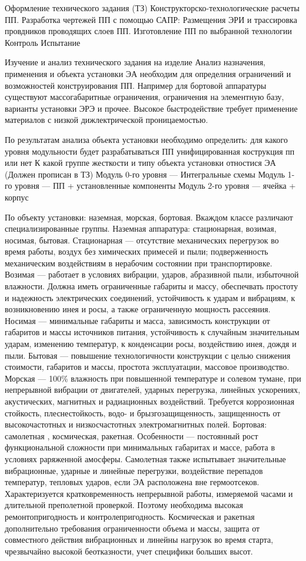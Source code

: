 \documentclass{article}
\begin{document}
Оформление технического задания (ТЗ)
Конструкторско-технологические расчеты ПП.
Разработка чертежей ПП с помощью САПР: Размещения ЭРИ и трассировка провдников проводящих слоев ПП.
Изготовление ПП по выбранной технологии
Контроль
Испытание

Изучение и анализ технического задания на изделие
Анализ назначения, применения и объекта установки ЭА необходим для определния ограничений и возможностей конструирования ПП. Например для бортовой аппаратуры существуют массогабаритные ограничения, ограничения на элементную базу, варианты установки ЭРЭ и прочее. Высокое быстродействие требует применение материалов с низкой дижлектрической проницаемостью.

По результатам анализа объекта установки необходимо определить:
для какого уровня модульности будет разрабатываться ПП
унифицированная кострукция пп или нет
К какой группе жесткости и типу объекта установки отностися ЭА (Должен прописан в ТЗ)
Модуль 0-го уровня --- Интегральные схемы
Модуль 1-го уровня --- ПП + установленные компоненты
Модуль 2-го уровня --- ячейка + корпус

По объекту установки: наземная, морская, бортовая. Вкаждом классе различают специализированные группы.
Наземная аппаратура: стационарная, возимая, носимая, бытовая.
Стационарная --- отсутствие механических перегрузок во время работы, воздух без химических примесей и пыли; подверженность механическим воздействиям в нерабочим состоянии при транспортировке.
Возимая --- работает в условиях вибрации, ударов, абразивной пыли, избыточной влажности. Должна иметь ограниченные габариты и массу, обеспечвать простоту и надежность электрических соединений, устойчивость к ударам и вибрациям, к возникновению инея и росы, а также ограниченную мощность рассеяния.
Носимая --- минимальные габариты и масса, зависимость конструкции от габаритов и массы источников питания, устойчивость к случайным значительным ударам, изменению температур, к конденсации росы, воздействию инея, дождя и пыли.
Бытовая --- повышение технологичности конструкции с целью снижения стоимости, габаритов и массы, простота эксплуатации, массовое производство.
Морская --- 100\% влажность при повышенной температуре и солевом тумане, при непрерывной вибрации от двигателей, ударных перегрузка, линейных ускорениях, акустических, магнитных и радиационных воздействий. Требуется коррозионная стойкость, плеснестойкость, водо- и брызгозащищенность, защищенность от высокочастотных и низкосчастотных электромагнитных полей.
Бортовая: самолетная , космическая, ракетная.
Особенности --- постоянный рост функциональной сложности при минимальных габаритах и массе, работа в условиях раряженной амосферы.
Самолетная также испытывает значительные вибрационные, ударные и линейные перегрузки, воздействие перепадов температур, тепловых ударов, если ЭА расположена вне гермоотсеков. Характеризуется кратковременность непрерывной работы, измеряемой часами и длительной преполетной проверкой. Поэтому необходима высокая ремонтопригодность и контролепригодность.
Космическая и ракетная дополнительно требования ограниченности объема и массы, защита от совместного действия вибрационных и линейны нагрузок во время старта, чрезвычайно высокой беотказности, учет специфики больших высот.
\end{document}
